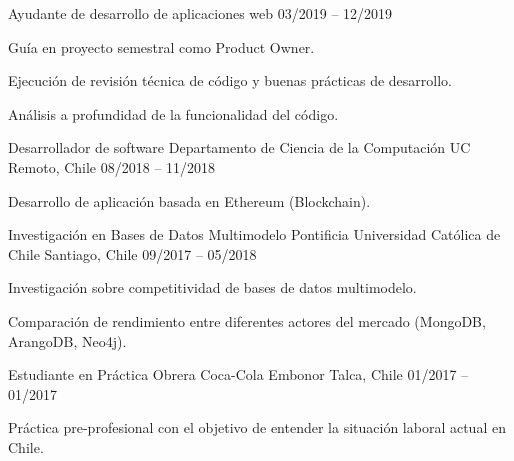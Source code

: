 \begin{cventries}
  \cventry
    {Ayudante de desarrollo de aplicaciones web} %
    { } %
    { } %
    {03/2019 – 12/2019} %
    {
      \begin{cvitems} %
        \item {Guía en proyecto semestral como Product Owner.}
        \item {Ejecución de revisión técnica de código y buenas prácticas de desarrollo.}
        \item {Análisis a profundidad de la funcionalidad del código.}
      \end{cvitems}
    }

  \cventry
    {Desarrollador de software} %
    {Departamento de Ciencia de la Computación UC} %
    {Remoto, Chile} %
    {08/2018 – 11/2018} %
    {
      \begin{cvitems} %
        \item {Desarrollo de aplicación basada en Ethereum (Blockchain).}
      \end{cvitems}
    }

  \cventry
    {Investigación en Bases de Datos Multimodelo} %
    {Pontificia Universidad Católica de Chile} %
    {Santiago, Chile} %
    {09/2017 – 05/2018} %
    {
      \begin{cvitems} %
        \item {Investigación sobre competitividad de bases de datos multimodelo.}
        \item {Comparación de rendimiento entre diferentes actores del mercado (MongoDB, ArangoDB, Neo4j).}
      \end{cvitems} 
    }

  \cventry
    {Estudiante en Práctica Obrera} %
    {Coca-Cola Embonor } %
    {Talca, Chile} %
    {01/2017 – 01/2017 } %
    {
      \begin{cvitems} %
        \item {Práctica pre-profesional con el objetivo de entender la situación laboral actual en Chile.}
      \end{cvitems}
    }

\end{cventries}
